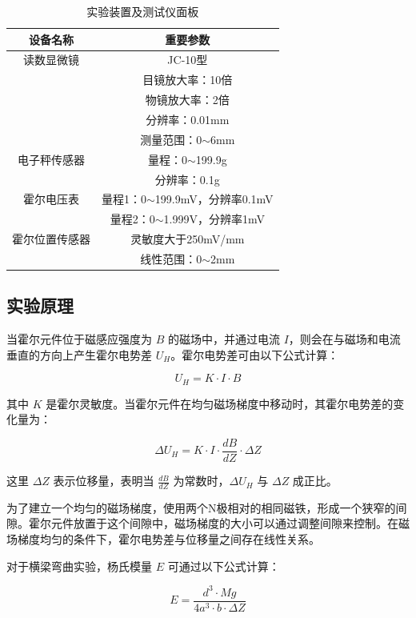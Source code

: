 \documentclass[zihao=5, UTF8]{article}
\theoremstyle{MyLineTheoremStyle} %
\theoremstyle{MyBlockTheoremStyle} %
\theoremstyle{MySubsubsectionStyle} %
\begin{document}
\noindent
\begin{table}[h!]
\centering
\caption{实验装置及测试仪面板}
\begin{tabular}{|c|c|}
\hline
\textbf{设备名称} & \textbf{重要参数} \\ \hline
读数显微镜 & JC-10型 \\ 
& 目镜放大率：10倍 \\ 
& 物镜放大率：2倍 \\ 
& 分辨率：0.01mm \\ 
& 测量范围：0$\sim$6mm \\ \hline

电子秤传感器 & 量程：0$\sim$199.9g \\ 
& 分辨率：0.1g \\ \hline

霍尔电压表 & 量程1：0$\sim$199.9mV，分辨率0.1mV \\ 
& 量程2：0$\sim$1.999V，分辨率1mV \\ \hline

霍尔位置传感器 & 灵敏度大于250mV/mm \\ 
& 线性范围：0$\sim$2mm \\ \hline
\end{tabular}
\end{table}


\subsection{实验原理}

当霍尔元件位于磁感应强度为 \(B\) 的磁场中，并通过电流 \(I\)，则会在与磁场和电流垂直的方向上产生霍尔电势差 \(U_H\)。霍尔电势差可由以下公式计算：

\[ U_H = K \cdot I \cdot B \]

其中 \(K\) 是霍尔灵敏度。当霍尔元件在均匀磁场梯度中移动时，其霍尔电势差的变化量为：

\[ \Delta U_H = K \cdot I \cdot \frac{dB}{dZ} \cdot \Delta Z \]

这里 \(\Delta Z\) 表示位移量，表明当 \(\frac{dB}{dZ}\) 为常数时，\(\Delta U_H\) 与 \(\Delta Z\) 成正比。

为了建立一个均匀的磁场梯度，使用两个N极相对的相同磁铁，形成一个狭窄的间隙。霍尔元件放置于这个间隙中，磁场梯度的大小可以通过调整间隙来控制。在磁场梯度均匀的条件下，霍尔电势差与位移量之间存在线性关系。

对于横梁弯曲实验，杨氏模量 \(E\) 可通过以下公式计算：

\[ E = \frac{d^3 \cdot Mg}{4a^3 \cdot b \cdot \Delta Z} \]
\end{document}
